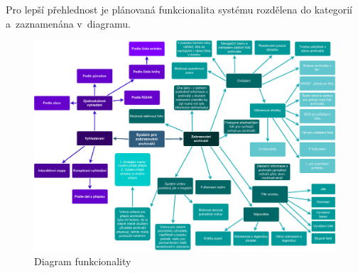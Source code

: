 \newpara
Pro lepší přehlednost je plánovaná funkcionalita systému rozdělena do kategorií a~zaznamenána v~diagramu.
\begin{figure}[htbp]
\centering
    \includegraphics[scale=.45]{obrazky-figures/archives/functionality_diagram.pdf}
    \caption{Diagram funkcionality}
\end{figure}